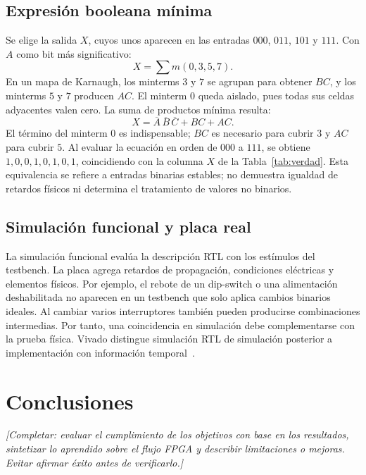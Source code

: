 \documentclass[conference]{IEEEtran}
\newcommand{\pendiente}[1]{\textit{[Completar: #1.]}}
\begin{document}
\subsection{Expresión booleana mínima}
Se elige la salida $X$, cuyos unos aparecen en las entradas $000$,
$011$, $101$ y $111$. Con $A$ como bit más significativo:
\begin{equation}
X=\sum m(0,3,5,7).
\end{equation}
En un mapa de Karnaugh, los minterms $3$ y $7$ se agrupan para
obtener $BC$, y los minterms $5$ y $7$ producen $AC$. El minterm
$0$ queda aislado, pues todas sus celdas adyacentes valen cero.
La suma de productos mínima resulta:
\begin{equation}
\boxed{X=\overline{A}\,\overline{B}\,\overline{C}+BC+AC.}
\label{eq:x_minima}
\end{equation}
El término del minterm $0$ es indispensable; $BC$ es necesario para
cubrir $3$ y $AC$ para cubrir $5$. Al evaluar la ecuación en orden
de $000$ a $111$, se obtiene $1,0,0,1,0,1,0,1$, coincidiendo con
la columna $X$ de la Tabla~\ref{tab:verdad}. Esta equivalencia se
refiere a entradas binarias estables; no demuestra igualdad de
retardos físicos ni determina el tratamiento de valores no binarios.

\subsection{Simulación funcional y placa real}
La simulación funcional evalúa la descripción RTL con los estímulos
del testbench. La placa agrega retardos de propagación, condiciones
eléctricas y elementos físicos. Por ejemplo, el rebote de un
dip-switch o una alimentación deshabilitada no aparecen en un
testbench que solo aplica cambios binarios ideales. Al cambiar
varios interruptores también pueden producirse combinaciones
intermedias. Por tanto, una coincidencia en simulación debe
complementarse con la prueba física. Vivado distingue simulación
RTL de simulación posterior a implementación con información
temporal~\cite{simulacion}.

\section{Conclusiones}
\pendiente{evaluar el cumplimiento de los objetivos con base en los
resultados, sintetizar lo aprendido sobre el flujo FPGA y describir
limitaciones o mejoras. Evitar afirmar éxito antes de verificarlo}
\end{document}
